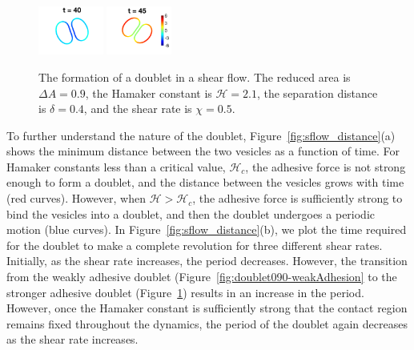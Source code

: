 \documentclass[prf,superscriptaddress,showkeys,longbibliography]{revtex4-1}
\begin{document}
\begin{figure}[htp]
  \includegraphics[width=0.19\textwidth]{figs/adR4em1adS2p1e0Chi5em1_ra090_image09.png}
  \includegraphics[width=0.19\textwidth]{figs/adR4em1adS2p1e0Chi5em1_ra090_image10.png}
  \caption{\label{fig:doublet090-strongAdhesion} The formation of a
  doublet in a shear flow.  The reduced area is $\Delta A = 0.9$, the
  Hamaker constant is $\mathcal{H}=2.1$, the separation distance is
  $\delta = 0.4$, and the shear rate is $\chi=0.5$.}
\end{figure}

To further understand the nature of the doublet,
Figure~\ref{fig:sflow_distance}(a) shows the minimum distance between
the two vesicles as a function of time.  For Hamaker constants less than
a critical value, $\mathcal{H}_c$, the adhesive force is not strong
enough to form a doublet, and the distance between the vesicles grows
with time (red curves).  However, when $\mathcal{H} > \mathcal{H}_c$,
the adhesive force is sufficiently strong to bind the vesicles into a
doublet, and then the doublet undergoes a periodic motion (blue curves).
In Figure~\ref{fig:sflow_distance}(b), we plot the time required for the
doublet to make a complete revolution for three different shear rates.
Initially, as the shear rate increases, the period decreases.  However,
the transition from the weakly adhesive doublet
(Figure~\ref{fig:doublet090-weakAdhesion} to the stronger adhesive
doublet (Figure~\ref{fig:doublet090-strongAdhesion}) results in an
increase in the period.  However, once the Hamaker constant is
sufficiently strong that the contact region remains fixed throughout the
dynamics, the period of the doublet again decreases as the shear rate
increases.
\end{document}
